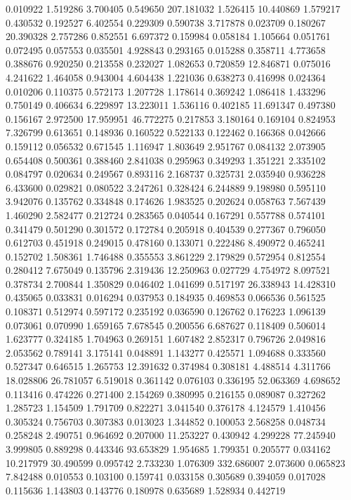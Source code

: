0.010922
1.519286
3.700405
0.549650
207.181032
1.526415
10.440869
1.579217
0.430532
0.192527
6.402554
0.229309
0.590738
3.717878
0.023709
0.180267
20.390328
2.757286
0.852551
6.697372
0.159984
0.058184
1.105664
0.051761
0.072495
0.057553
0.035501
4.928843
0.293165
0.015288
0.358711
4.773658
0.388676
0.920250
0.213558
0.232027
1.082653
0.720859
12.846871
0.075016
4.241622
1.464058
0.943004
4.604438
1.221036
0.638273
0.416998
0.024364
0.010206
0.110375
0.572173
1.207728
1.178614
0.369242
1.086418
1.433296
0.750149
0.406634
6.229897
13.223011
1.536116
0.402185
11.691347
0.497380
0.156167
2.972500
17.959951
46.772275
0.217853
3.180164
0.169104
0.824953
7.326799
0.613651
0.148936
0.160522
0.522133
0.122462
0.166368
0.042666
0.159112
0.056532
0.671545
1.116947
1.803649
2.951767
0.084132
2.073905
0.654408
0.500361
0.388460
2.841038
0.295963
0.349293
1.351221
2.335102
0.084797
0.020634
0.249567
0.893116
2.168737
0.325731
2.035940
0.936228
6.433600
0.029821
0.080522
3.247261
0.328424
6.244889
9.198980
0.595110
3.942076
0.135762
0.334848
0.174626
1.983525
0.202624
0.058763
7.567439
1.460290
2.582477
0.212724
0.283565
0.040544
0.167291
0.557788
0.574101
0.341479
0.501290
0.301572
0.172784
0.205918
0.404539
0.277367
0.796050
0.612703
0.451918
0.249015
0.478160
0.133071
0.222486
8.490972
0.465241
0.152702
1.508361
1.746488
0.355553
3.861229
2.179829
0.572954
0.812554
0.280412
7.675049
0.135796
2.319436
12.250963
0.027729
4.754972
8.097521
0.378734
2.700844
1.350829
0.046402
1.041699
0.517197
26.338943
14.428310
0.435065
0.033831
0.016294
0.037953
0.184935
0.469853
0.066536
0.561525
0.108371
0.512974
0.597172
0.235192
0.036590
0.126762
0.176223
1.096139
0.073061
0.070990
1.659165
7.678545
0.200556
6.687627
0.118409
0.506014
1.623777
0.324185
1.704963
0.269151
1.607482
2.852317
0.796726
2.049816
2.053562
0.789141
3.175141
0.048891
1.143277
0.425571
1.094688
0.333560
0.527347
0.646515
1.265753
12.391632
0.374984
0.308181
4.488514
4.311766
18.028806
26.781057
6.519018
0.361142
0.076103
0.336195
52.063369
4.698652
0.113416
0.474226
0.271400
2.154269
0.380995
0.216155
0.089087
0.327262
1.285723
1.154509
1.791709
0.822271
3.041540
0.376178
4.124579
1.410456
0.305324
0.756703
0.307383
0.013023
1.344852
0.100053
2.568258
0.048734
0.258248
2.490751
0.964692
0.207000
11.253227
0.430942
4.299228
77.245940
3.999805
0.889298
0.443346
93.653829
1.954685
1.799351
0.205577
0.034162
10.217979
30.490599
0.095742
2.733230
1.076309
332.686007
2.073600
0.065823
7.842488
0.010553
0.103100
0.159741
0.033158
0.305689
0.394059
0.017028
0.115636
1.143803
0.143776
0.180978
0.635689
1.528934
0.442719
